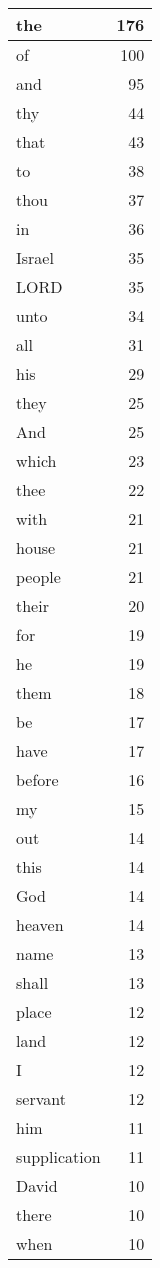 \begin{center}
\begin{longtable}{l|r}
\hline \hline
\endlastfoot
the & 176 \\ \hline
of & 100 \\ \hline
and & 95 \\ \hline
thy & 44 \\ \hline
that & 43 \\ \hline
to & 38 \\ \hline
thou & 37 \\ \hline
in & 36 \\ \hline
Israel & 35 \\ \hline
LORD & 35 \\ \hline
unto & 34 \\ \hline
all & 31 \\ \hline
his & 29 \\ \hline
they & 25 \\ \hline
And & 25 \\ \hline
which & 23 \\ \hline
thee & 22 \\ \hline
with & 21 \\ \hline
house & 21 \\ \hline
people & 21 \\ \hline
their & 20 \\ \hline
for & 19 \\ \hline
he & 19 \\ \hline
them & 18 \\ \hline
be & 17 \\ \hline
have & 17 \\ \hline
before & 16 \\ \hline
my & 15 \\ \hline
out & 14 \\ \hline
this & 14 \\ \hline
God & 14 \\ \hline
heaven & 14 \\ \hline
name & 13 \\ \hline
shall & 13 \\ \hline
place & 12 \\ \hline
land & 12 \\ \hline
I & 12 \\ \hline
servant & 12 \\ \hline
him & 11 \\ \hline
supplication & 11 \\ \hline
David & 10 \\ \hline
there & 10 \\ \hline
when & 10 \\ \hline

\end{longtable}
\end{center}
